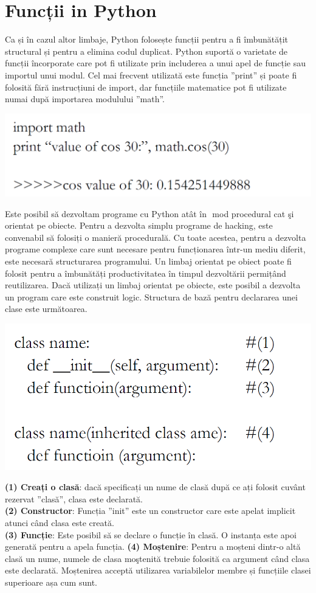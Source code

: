 \documentclass[oneside,20pt]{article}          %
\begin{document}
\section{Funcții in Python}
Ca și în cazul altor limbaje, Python folosește funcții pentru a fi îmbunătățit structural și pentru a elimina codul duplicat. Python suportă
o varietate de funcții încorporate care pot fi utilizate prin includerea a
unui apel de funcție sau importul unui modul. Cel mai frecvent utilizată  este funcția ”print” și poate fi folosită fără instrucțiuni de import, dar
funcțiile matematice pot fi utilizate numai după importarea  modulului ”math”. 
\begin{center}
\includegraphics[height=2 cm]{5.png}
\end{center}
Este posibil să dezvoltam programe cu Python atât în ​​
mod procedural cat şi orientat pe obiecte. Pentru a dezvolta simplu
programe de hacking, este convenabil să folosiți o manieră procedurală.
Cu toate acestea, pentru a dezvolta programe complexe care sunt necesare pentru
funcționarea într-un mediu diferit, este necesară structurarea
programului. Un limbaj orientat pe obiect poate fi folosit pentru a îmbunătăți
productivitatea în timpul dezvoltării permițând reutilizarea. Dacă utilizați un limbaj orientat pe obiecte, este posibil
a dezvolta un program care este construit logic.
Structura de bază pentru declararea unei clase este următoarea.
\begin{center}
\includegraphics[height=2 cm]{6.png}
\end{center}

\textbf{(1) Creați o clasă}: dacă specificați un nume de clasă după ce ați folosit cuvânt rezervat ”clasă”, clasa este declarată.\\
\textbf{(2) Constructor}: Funcția ”init” este un constructor care este
apelat implicit atunci când clasa este creată.\\
\textbf{(3) Funcție}: Este posibil să se declare o funcție în clasă. O
instanța este apoi generată pentru a apela funcția.
\textbf{(4) Moștenire}: Pentru a moșteni dintr-o altă clasă un nume, numele de
clasa moştenită trebuie folosită ca argument când clasa
este declarată. Moștenirea acceptă utilizarea variabilelor membre și funcțiile clasei superioare așa cum sunt.
\end{document}
